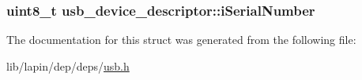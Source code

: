 \hypertarget{structusb__device__descriptor_a105d91b68091e61c9b13ea673fb98eaf}{
\subsubsection[{i\-Serial\-Number}]{\setlength{\rightskip}{0pt plus 5cm}uint8\-\_\-t usb\-\_\-device\-\_\-descriptor\-::i\-Serial\-Number}}\label{structusb__device__descriptor_a105d91b68091e61c9b13ea673fb98eaf}


The documentation for this struct was generated from the following file\-:\begin{DoxyCompactItemize}
\item 
lib/lapin/dep/deps/\hyperlink{deps_2usb_8h}{usb.\-h}\end{DoxyCompactItemize}
